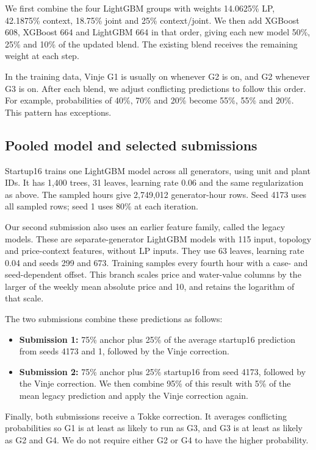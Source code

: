 \documentclass[a4paper,11pt]{article}
\begin{document}
We first combine the four LightGBM groups with weights 14.0625\% LP, 42.1875\% context, 18.75\% joint and 25\% context/joint. We then add XGBoost 608, XGBoost 664 and LightGBM 664 in that order, giving each new model 50\%, 25\% and 10\% of the updated blend. The existing blend receives the remaining weight at each step.

In the training data, Vinje G1 is usually on whenever G2 is on, and G2 whenever G3 is on. After each blend, we adjust conflicting predictions to follow this order. For example, probabilities of 40\%, 70\% and 20\% become 55\%, 55\% and 20\%. This pattern has exceptions.

\subsection*{Pooled model and selected submissions}
Startup16 trains one LightGBM model across all generators, using unit and plant IDs. It has 1,400 trees, 31 leaves, learning rate 0.06 and the same regularization as above. The sampled hours give 2,749,012 generator-hour rows. Seed 4173 uses all sampled rows; seed 1 uses 80\% at each iteration.

Our second submission also uses an earlier feature family, called the legacy models. These are separate-generator LightGBM models with 115 input, topology and price-context features, without LP inputs. They use 63 leaves, learning rate 0.04 and seeds 299 and 673. Training samples every fourth hour with a case- and seed-dependent offset. This branch scales price and water-value columns by the larger of the weekly mean absolute price and 10, and retains the logarithm of that scale.

The two submissions combine these predictions as follows:
\begin{itemize}
\item \textbf{Submission 1:} 75\% anchor plus 25\% of the average startup16 prediction from seeds 4173 and 1, followed by the Vinje correction.
\item \textbf{Submission 2:} 75\% anchor plus 25\% startup16 from seed 4173, followed by the Vinje correction. We then combine 95\% of this result with 5\% of the mean legacy prediction and apply the Vinje correction again.
\end{itemize}
Finally, both submissions receive a Tokke correction. It averages conflicting probabilities so G1 is at least as likely to run as G3, and G3 is at least as likely as G2 and G4. We do not require either G2 or G4 to have the higher probability.
\end{document}
